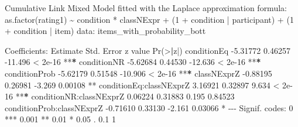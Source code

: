 \documentclass[
  ignorenonframetext,
]{beamer}
\newenvironment{Shaded}{\begin{snugshade}}{\end{snugshade}}
\newcommand{\DecValTok}[1]{\textcolor[rgb]{0.00,0.00,0.81}{#1}}
\newcommand{\ErrorTok}[1]{\textcolor[rgb]{0.64,0.00,0.00}{\textbf{#1}}}
\newcommand{\FloatTok}[1]{\textcolor[rgb]{0.00,0.00,0.81}{#1}}
\newcommand{\FunctionTok}[1]{\textcolor[rgb]{0.00,0.00,0.00}{#1}}
\newcommand{\NormalTok}[1]{#1}
\newcommand{\SpecialCharTok}[1]{\textcolor[rgb]{0.00,0.00,0.00}{#1}}
\newcommand{\StringTok}[1]{\textcolor[rgb]{0.31,0.60,0.02}{#1}}
\begin{document}
\begin{frame}[fragile]
\footnotesize

\begin{Shaded}
\begin{Highlighting}[]
\NormalTok{Cumulative Link Mixed Model fitted with the Laplace approximation}
\NormalTok{formula}\SpecialCharTok{:} \FunctionTok{as.factor}\NormalTok{(rating1) }\SpecialCharTok{\textasciitilde{}}\NormalTok{ condition }\SpecialCharTok{*}\NormalTok{ classNExpr }\SpecialCharTok{+}\NormalTok{ (}\DecValTok{1} \SpecialCharTok{+}\NormalTok{ condition }\SpecialCharTok{|}  
\NormalTok{  participant) }\SpecialCharTok{+}\NormalTok{ (}\DecValTok{1} \SpecialCharTok{+}\NormalTok{ condition }\SpecialCharTok{|}\NormalTok{ item)}
\NormalTok{  data}\SpecialCharTok{:}\NormalTok{    items\_with\_probability\_bott}

\NormalTok{Coefficients}\SpecialCharTok{:}
\NormalTok{                           Estimate Std. Error z value }\FunctionTok{Pr}\NormalTok{(}\SpecialCharTok{\textgreater{}}\ErrorTok{|}\NormalTok{z}\SpecialCharTok{|}\NormalTok{)    }
\NormalTok{conditionEq               }\SpecialCharTok{{-}}\FloatTok{5.31772}    \FloatTok{0.46257} \SpecialCharTok{{-}}\FloatTok{11.496}  \SpecialCharTok{\textless{}} \FloatTok{2e{-}16} \SpecialCharTok{**}\ErrorTok{*}
\NormalTok{conditionNR               }\SpecialCharTok{{-}}\FloatTok{5.62684}    \FloatTok{0.44530} \SpecialCharTok{{-}}\FloatTok{12.636}  \SpecialCharTok{\textless{}} \FloatTok{2e{-}16} \SpecialCharTok{**}\ErrorTok{*}
\NormalTok{conditionProb             }\SpecialCharTok{{-}}\FloatTok{5.62179}    \FloatTok{0.51548} \SpecialCharTok{{-}}\FloatTok{10.906}  \SpecialCharTok{\textless{}} \FloatTok{2e{-}16} \SpecialCharTok{**}\ErrorTok{*}
\NormalTok{classNExprZ               }\SpecialCharTok{{-}}\FloatTok{0.88195}    \FloatTok{0.26981}  \SpecialCharTok{{-}}\FloatTok{3.269}  \FloatTok{0.00108} \SpecialCharTok{**} 
\NormalTok{conditionEq}\SpecialCharTok{:}\NormalTok{classNExprZ    }\FloatTok{3.16921}    \FloatTok{0.32897}   \FloatTok{9.634}  \SpecialCharTok{\textless{}} \FloatTok{2e{-}16} \SpecialCharTok{**}\ErrorTok{*}
\NormalTok{conditionNR}\SpecialCharTok{:}\NormalTok{classNExprZ    }\FloatTok{0.06224}    \FloatTok{0.31883}   \FloatTok{0.195}  \FloatTok{0.84523}    
\NormalTok{conditionProb}\SpecialCharTok{:}\NormalTok{classNExprZ }\SpecialCharTok{{-}}\FloatTok{0.71610}    \FloatTok{0.33130}  \SpecialCharTok{{-}}\FloatTok{2.161}  \FloatTok{0.03066} \SpecialCharTok{*}  
\SpecialCharTok{{-}{-}{-}}
\NormalTok{Signif. codes}\SpecialCharTok{:}  \DecValTok{0} \StringTok{\textquotesingle{}***\textquotesingle{}} \FloatTok{0.001} \StringTok{\textquotesingle{}**\textquotesingle{}} \FloatTok{0.01} \StringTok{\textquotesingle{}*\textquotesingle{}} \FloatTok{0.05} \StringTok{\textquotesingle{}.\textquotesingle{}} \FloatTok{0.1} \StringTok{\textquotesingle{} \textquotesingle{}} \DecValTok{1}\StringTok{\textasciigrave{}\textasciigrave{}\textasciigrave{}}
\end{Highlighting}
\end{Shaded}
\end{frame}
\end{document}
